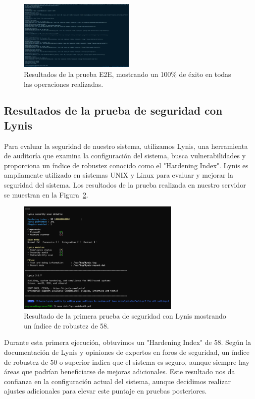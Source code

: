 \begin{figure}[H]
    \centering
    \includegraphics[width=0.5\textwidth]{figuras/e2etest.png}
    \caption{Resultados de la prueba E2E, mostrando un 100\% de éxito en todas las operaciones realizadas.}
    \label{fig:e2etest}
\end{figure}

\subsection{Resultados de la prueba de seguridad con Lynis}

Para evaluar la seguridad de nuestro sistema, utilizamos Lynis, una herramienta de auditoría que examina la configuración del sistema, busca vulnerabilidades y proporciona un índice de robustez conocido como el "Hardening Index". Lynis es ampliamente utilizado en sistemas UNIX y Linux para evaluar y mejorar la seguridad del sistema. Los resultados de la prueba realizada en nuestro servidor se muestran en la Figura~\ref{fig:primeraPruebaLynis}.

\begin{figure}[H]
    \centering
    \includegraphics[width=0.7\textwidth]{figuras/primeraPruebaLynis.png}
    \caption{Resultado de la primera prueba de seguridad con Lynis mostrando un índice de robustez de 58.}
    \label{fig:primeraPruebaLynis}
\end{figure}

Durante esta primera ejecución, obtuvimos un "Hardening Index" de 58. Según la documentación de Lynis y opiniones de expertos en foros de seguridad, un índice de robustez de 50 o superior indica que el sistema es seguro, aunque siempre hay áreas que podrían beneficiarse de mejoras adicionales. Este resultado nos da confianza en la configuración actual del sistema, aunque decidimos realizar ajustes adicionales para elevar este puntaje en pruebas posteriores.

